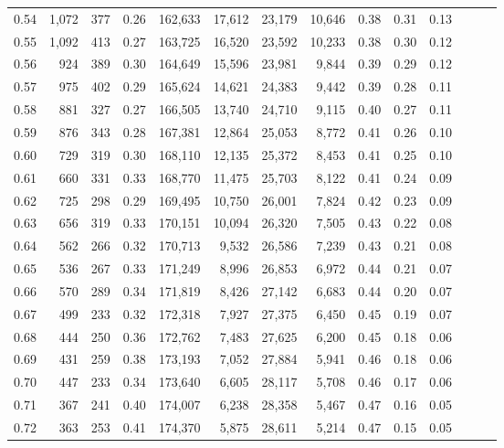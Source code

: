 \begin{tabular}{rrrrrrrrrrrrrr}
0.54 &  1,072 &  377 &  0.26 &  162,633 &   17,612 &  23,179 &  10,646 &  0.38 &  0.31 &      0.13 \\
0.55 &  1,092 &  413 &  0.27 &  163,725 &   16,520 &  23,592 &  10,233 &  0.38 &  0.30 &      0.12 \\
0.56 &    924 &  389 &  0.30 &  164,649 &   15,596 &  23,981 &   9,844 &  0.39 &  0.29 &      0.12 \\
0.57 &    975 &  402 &  0.29 &  165,624 &   14,621 &  24,383 &   9,442 &  0.39 &  0.28 &      0.11 \\
0.58 &    881 &  327 &  0.27 &  166,505 &   13,740 &  24,710 &   9,115 &  0.40 &  0.27 &      0.11 \\
0.59 &    876 &  343 &  0.28 &  167,381 &   12,864 &  25,053 &   8,772 &  0.41 &  0.26 &      0.10 \\
0.60 &    729 &  319 &  0.30 &  168,110 &   12,135 &  25,372 &   8,453 &  0.41 &  0.25 &      0.10 \\
0.61 &    660 &  331 &  0.33 &  168,770 &   11,475 &  25,703 &   8,122 &  0.41 &  0.24 &      0.09 \\
0.62 &    725 &  298 &  0.29 &  169,495 &   10,750 &  26,001 &   7,824 &  0.42 &  0.23 &      0.09 \\
0.63 &    656 &  319 &  0.33 &  170,151 &   10,094 &  26,320 &   7,505 &  0.43 &  0.22 &      0.08 \\
0.64 &    562 &  266 &  0.32 &  170,713 &    9,532 &  26,586 &   7,239 &  0.43 &  0.21 &      0.08 \\
0.65 &    536 &  267 &  0.33 &  171,249 &    8,996 &  26,853 &   6,972 &  0.44 &  0.21 &      0.07 \\
0.66 &    570 &  289 &  0.34 &  171,819 &    8,426 &  27,142 &   6,683 &  0.44 &  0.20 &      0.07 \\
0.67 &    499 &  233 &  0.32 &  172,318 &    7,927 &  27,375 &   6,450 &  0.45 &  0.19 &      0.07 \\
0.68 &    444 &  250 &  0.36 &  172,762 &    7,483 &  27,625 &   6,200 &  0.45 &  0.18 &      0.06 \\
0.69 &    431 &  259 &  0.38 &  173,193 &    7,052 &  27,884 &   5,941 &  0.46 &  0.18 &      0.06 \\
0.70 &    447 &  233 &  0.34 &  173,640 &    6,605 &  28,117 &   5,708 &  0.46 &  0.17 &      0.06 \\
0.71 &    367 &  241 &  0.40 &  174,007 &    6,238 &  28,358 &   5,467 &  0.47 &  0.16 &      0.05 \\
0.72 &    363 &  253 &  0.41 &  174,370 &    5,875 &  28,611 &   5,214 &  0.47 &  0.15 &      0.05 \\

\end{tabular}
